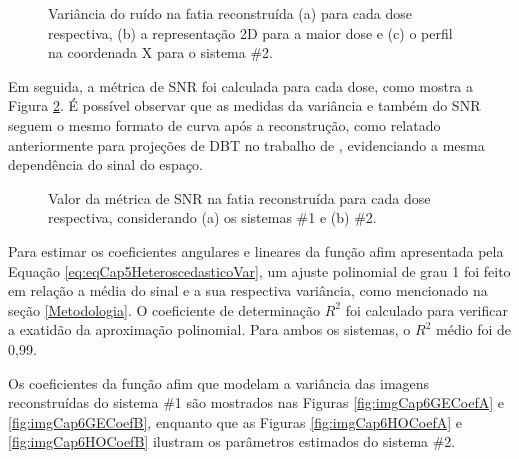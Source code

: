 \begin{figure}[!ht]
	\centering
	\caption{Variância do ruído na fatia reconstruída (a) para cada dose respectiva, (b) a representação \acs{2D} para a maior dose e (c) o perfil na coordenada X para o sistema \#2.}
	
	\hfil
	\label{fig:imgCap6HO_Var}
\end{figure}

Em seguida, a métrica de \acs{SNR} foi calculada para cada dose, como mostra a Figura \ref{fig:imgCap6SNR}. É possível observar que as medidas da variância e também do \acs{SNR} seguem o mesmo formato de curva após a reconstrução, como relatado anteriormente para projeções de \acs{DBT} no trabalho de , evidenciando a mesma dependência do sinal do espaço.


\begin{figure}[!ht]
	\centering
	\caption{Valor da métrica de \acs{SNR} na fatia reconstruída para cada dose respectiva, considerando (a) os sistemas \#1 e (b) \#2.}
	
	
	\label{fig:imgCap6SNR}  
\end{figure}


Para estimar os coeficientes angulares e lineares da função afim apresentada pela Equação \ref{eq:eqCap5HeteroscedasticoVar}, um ajuste polinomial de grau 1 foi feito em relação a média do sinal e a sua respectiva variância, como mencionado na seção \ref{Metodologia}. O coeficiente de determinação $R^2$ foi calculado para verificar a exatidão da aproximação polinomial. Para ambos os sistemas, o $R^2$ médio foi de 0,99. 

Os coeficientes da função afim que modelam a variância das imagens reconstruídas do sistema \#1 são mostrados nas Figuras \ref{fig:imgCap6GECoefA} e \ref{fig:imgCap6GECoefB}, enquanto que as Figuras \ref{fig:imgCap6HOCoefA} e \ref{fig:imgCap6HOCoefB} ilustram os parâmetros estimados do sistema \#2.


